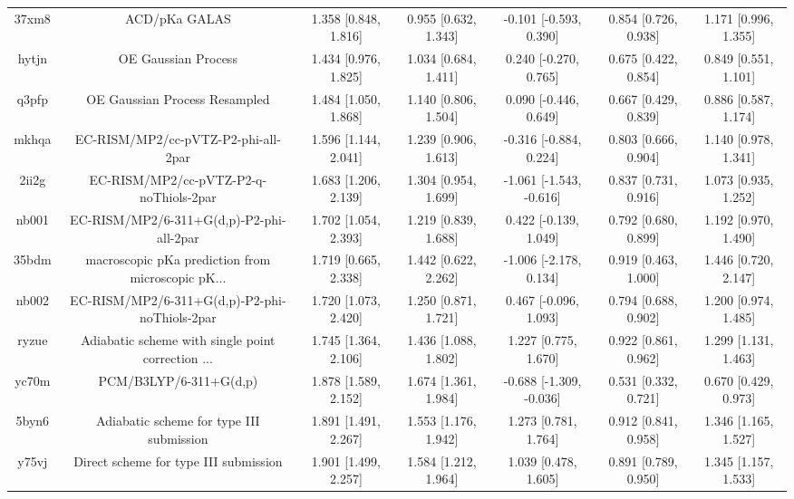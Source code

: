 \documentclass{article}
\begin{document}
\begin{center}
\begin{longtable}{|ccccccc|}
 37xm8 &                                      ACD/pKa GALAS &  1.358 [0.848, 1.816] &  0.955 [0.632, 1.343] &   -0.101 [-0.593, 0.390] &  0.854 [0.726, 0.938] &   1.171 [0.996, 1.355] \\
 hytjn &                                OE Gaussian Process &  1.434 [0.976, 1.825] &  1.034 [0.684, 1.411] &    0.240 [-0.270, 0.765] &  0.675 [0.422, 0.854] &   0.849 [0.551, 1.101] \\
 q3pfp &                      OE Gaussian Process Resampled &  1.484 [1.050, 1.868] &  1.140 [0.806, 1.504] &    0.090 [-0.446, 0.649] &  0.667 [0.429, 0.839] &   0.886 [0.587, 1.174] \\
 mkhqa &                EC-RISM/MP2/cc-pVTZ-P2-phi-all-2par &  1.596 [1.144, 2.041] &  1.239 [0.906, 1.613] &   -0.316 [-0.884, 0.224] &  0.803 [0.666, 0.904] &   1.140 [0.978, 1.341] \\
 2ii2g &             EC-RISM/MP2/cc-pVTZ-P2-q-noThiols-2par &  1.683 [1.206, 2.139] &  1.304 [0.954, 1.699] &  -1.061 [-1.543, -0.616] &  0.837 [0.731, 0.916] &   1.073 [0.935, 1.252] \\
 nb001 &           EC-RISM/MP2/6-311+G(d,p)-P2-phi-all-2par &  1.702 [1.054, 2.393] &  1.219 [0.839, 1.688] &    0.422 [-0.139, 1.049] &  0.792 [0.680, 0.899] &   1.192 [0.970, 1.490] \\
 35bdm &  macroscopic pKa prediction from microscopic pK... &  1.719 [0.665, 2.338] &  1.442 [0.622, 2.262] &   -1.006 [-2.178, 0.134] &  0.919 [0.463, 1.000] &   1.446 [0.720, 2.147] \\
 nb002 &      EC-RISM/MP2/6-311+G(d,p)-P2-phi-noThiols-2par &  1.720 [1.073, 2.420] &  1.250 [0.871, 1.721] &    0.467 [-0.096, 1.093] &  0.794 [0.688, 0.902] &   1.200 [0.974, 1.485] \\
 ryzue &  Adiabatic scheme with single point correction ... &  1.745 [1.364, 2.106] &  1.436 [1.088, 1.802] &     1.227 [0.775, 1.670] &  0.922 [0.861, 0.962] &   1.299 [1.131, 1.463] \\
 yc70m &                             PCM/B3LYP/6-311+G(d,p) &  1.878 [1.589, 2.152] &  1.674 [1.361, 1.984] &  -0.688 [-1.309, -0.036] &  0.531 [0.332, 0.721] &   0.670 [0.429, 0.973] \\
 5byn6 &           Adiabatic scheme for type III submission &  1.891 [1.491, 2.267] &  1.553 [1.176, 1.942] &     1.273 [0.781, 1.764] &  0.912 [0.841, 0.958] &   1.346 [1.165, 1.527] \\
 y75vj &              Direct scheme for type III submission &  1.901 [1.499, 2.257] &  1.584 [1.212, 1.964] &     1.039 [0.478, 1.605] &  0.891 [0.789, 0.950] &   1.345 [1.157, 1.533] \\

\end{longtable}
\end{center}
\end{document}
